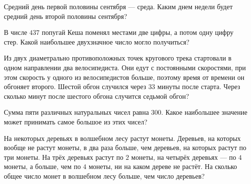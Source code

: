 \begin{consultation}
	\begin{listofex}
	\item Средний день первой половины сентября --- среда. Каким днем недели будет средний день второй половины сентября?
	\item В числе \( 437 \) попугай Кеша поменял местами две цифры, а потом одну цифру стер. Какой наибольшее двухзначное число могло получиться?
	\item Из двух диаметрально противоположных точек кругового трека стартовали в одном направлении два велосипедиста. Они едут с постоянными скоростями, при этом скорость у одного из велосипедистов больше, поэтому время от времени он обгоняет второго. Шестой обгон случился через \( 33 \) минуты после старта. Через сколько минут после шестого обгона случится седьмой обгон?
	\item Сумма пяти различных натуральных чисел равна \( 300 \). Какое наибольшее значение может принимать самое большое из этих чисел?
	\item На некоторых деревьях в волшебном лесу растут монеты. Деревьев, на которых вообще не растут монеты, в два раза больше, чем деревьев, на которых растут по
	три монеты. На трёх деревьях растут по \( 2 \) монеты, на четырёх деревьях — по \( 4 \) монеты, а
	больше, чем по \( 4 \) монеты, ни на каком дереве не растёт. На сколько общее число монет в
	волшебном лесу больше, чем число деревьев?
\end{listofex}
\end{consultation}

